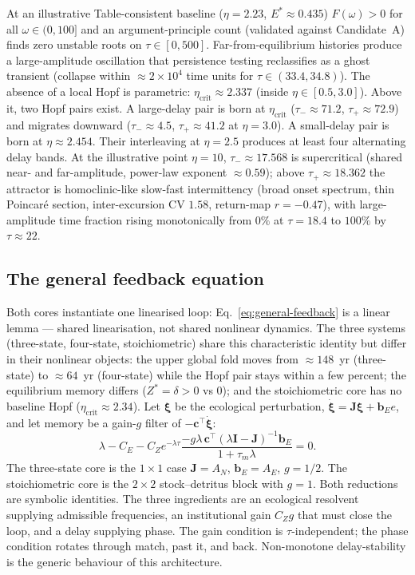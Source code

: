 \documentclass[11pt]{article}
\theoremstyle{definition}
\begin{document}
At an illustrative Table-consistent baseline ($\eta=2.23$, $E^*\approx 0.435$) $F(\omega)>0$ for all $\omega\in(0,100]$ and an argument-principle count (validated against Candidate~A) finds zero unstable roots on $\tau\in[0,500]$. Far-from-equilibrium histories produce a large-amplitude oscillation that persistence testing reclassifies as a ghost transient (collapse within $\approx 2\times 10^4$ time units for $\tau\in(33.4,34.8)$). The absence of a local Hopf is parametric: $\eta_{\mathrm{crit}}\approx 2.337$ (inside $\eta\in[0.5,3.0]$). Above it, two Hopf pairs exist. A large-delay pair is born at $\eta_{\mathrm{crit}}$ ($\tau_-\approx 71.2$, $\tau_+\approx 72.9$) and migrates downward ($\tau_-\approx 4.5$, $\tau_+\approx 41.2$ at $\eta=3.0$). A small-delay pair is born at $\eta\approx 2.454$. Their interleaving at $\eta=2.5$ produces at least four alternating delay bands. At the illustrative point $\eta=10$, $\tau_-\approx 17.568$ is supercritical (shared near- and far-amplitude, power-law exponent $\approx 0.59$); above $\tau_+\approx 18.362$ the attractor is homoclinic-like slow-fast intermittency (broad onset spectrum, thin Poincar\'e section, inter-excursion CV $1.58$, return-map $r=-0.47$), with large-amplitude time fraction rising monotonically from $0\%$ at $\tau=18.4$ to $100\%$ by $\tau\approx 22$.

\subsection{The general feedback equation}
\label{sec:general-feedback}

Both cores instantiate one linearised loop: Eq.~\eqref{eq:general-feedback} is a linear lemma --- shared linearisation, not shared nonlinear dynamics. The three systems (three-state, four-state, stoichiometric) share this characteristic identity but differ in their nonlinear objects: the upper global fold moves from $\approx 148$~yr (three-state) to $\approx 64$~yr (four-state) while the Hopf pair stays within a few percent; the equilibrium memory differs ($Z^*=\delta>0$ vs $0$); and the stoichiometric core has no baseline Hopf ($\eta_{\mathrm{crit}}\approx 2.34$). Let $\boldsymbol\xi$ be the ecological perturbation, $\dot{\boldsymbol\xi}=\mathbf J\boldsymbol\xi+\mathbf b_E e$, and let memory be a gain-$g$ filter of $-\mathbf c^\top\dot{\boldsymbol\xi}$:
\begin{equation}
\boxed{\;\lambda-C_E-C_Z e^{-\lambda\tau}\frac{-g\lambda\,\mathbf c^\top(\lambda\mathbf I-\mathbf J)^{-1}\mathbf b_E}{1+\tau_m\lambda}=0.\;}
\label{eq:general-feedback}
\end{equation}
The three-state core is the $1\times 1$ case $\mathbf J=A_N$, $\mathbf b_E=A_E$, $g=1/2$. The stoichiometric core is the $2\times 2$ stock--detritus block with $g=1$. Both reductions are symbolic identities. The three ingredients are an ecological resolvent supplying admissible frequencies, an institutional gain $C_Z g$ that must close the loop, and a delay supplying phase. The gain condition is $\tau$-independent; the phase condition rotates through match, past it, and back. Non-monotone delay-stability is the generic behaviour of this architecture.
\end{document}
